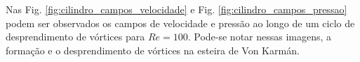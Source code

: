 \documentclass[tese_patricia]{subfiles}%
\begin{document}
Nas Fig. \ref{fig:cilindro_campos_velocidade} e Fig. \ref{fig:cilindro_campos_pressao} podem ser observados os campos de velocidade e pressão ao longo de um ciclo de desprendimento de vórtices para $Re = 100$. Pode-se notar nessas imagens, a formação e o desprendimento de vórtices na esteira de Von Karmán.


\begin{figure}[htb!]
	\centering
	 \\

\end{figure}
\end{document}
